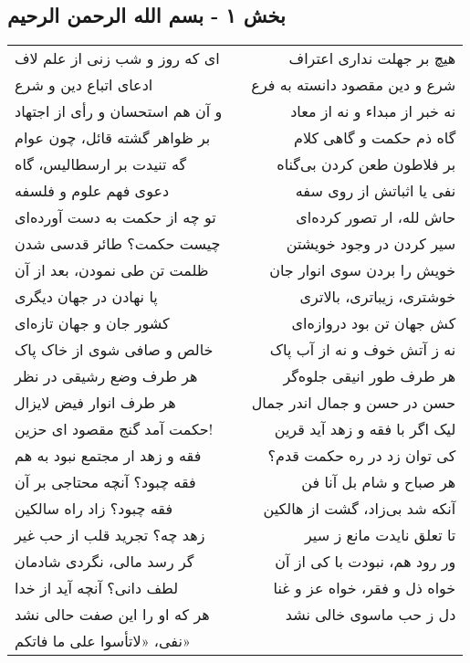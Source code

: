 \begin{center}
\section*{بخش ۱ - بسم الله الرحمن الرحیم}
\label{sec:001}
\begin{longtable}{l p{0.5cm} r}
ای که روز و شب زنی از علم لاف
&&
هیچ بر جهلت نداری اعتراف
\\
ادعای اتباع دین و شرع
&&
شرع و دین مقصود دانسته به فرع
\\
و آن هم استحسان و رأی از اجتهاد
&&
نه خبر از مبداء و نه از معاد
\\
بر ظواهر گشته قائل، چون عوام
&&
گاه ذم حکمت و گاهی کلام
\\
گه تنیدت بر ارسطالیس، گاه
&&
بر فلاطون طعن کردن بی‌گناه
\\
دعوی فهم علوم و فلسفه
&&
نفی یا اثباتش از روی سفه
\\
تو چه از حکمت به دست آورده‌ای
&&
حاش لله، ار تصور کرده‌ای
\\
چیست حکمت؟ طائر قدسی شدن
&&
سیر کردن در وجود خویشتن
\\
ظلمت تن طی نمودن، بعد از آن
&&
خویش را بردن سوی انوار جان
\\
پا نهادن در جهان دیگری
&&
خوشتری، زیباتری، بالاتری
\\
کشور جان و جهان تازه‌ای
&&
کش جهان تن بود دروازه‌ای
\\
خالص و صافی شوی از خاک پاک
&&
نه ز آتش خوف و نه از آب پاک
\\
هر طرف وضع رشیقی در نظر
&&
هر طرف طور انیقی جلوه‌گر
\\
هر طرف انوار فیض لایزال
&&
حسن در حسن و جمال اندر جمال
\\
حکمت آمد گنج مقصود ای حزین!
&&
لیک اگر با فقه و زهد آید قرین
\\
فقه و زهد ار مجتمع نبود به هم
&&
کی توان زد در ره حکمت قدم؟
\\
فقه چبود؟ آنچه محتاجی بر آن
&&
هر صباح و شام بل آنا فن
\\
فقه چبود؟ زاد راه سالکین
&&
آنکه شد بی‌زاد، گشت از هالکین
\\
زهد چه؟ تجرید قلب از حب غیر
&&
تا تعلق نایدت مانع ز سیر
\\
گر رسد مالی، نگردی شادمان
&&
ور رود هم، نبودت با کی از آن
\\
لطف دانی؟ آنچه آید از خدا
&&
خواه ذل و فقر، خواه عز و غنا
\\
هر که او را این صفت حالی نشد
&&
دل ز حب ماسوی خالی نشد
\\
نفی، «لاتأسوا علی ما فاتکم»

\end{longtable}
\end{center}

